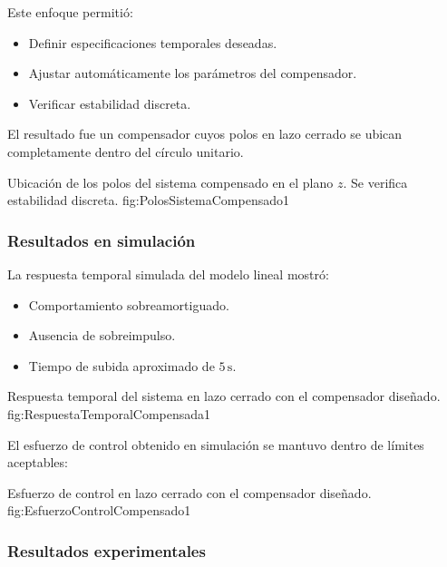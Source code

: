 Este enfoque permitió:

\begin{itemize}
	\item Definir especificaciones temporales deseadas.
	\item Ajustar automáticamente los parámetros del compensador.
	\item Verificar estabilidad discreta.
\end{itemize}

El resultado fue un compensador cuyos polos en lazo cerrado se ubican completamente dentro del círculo unitario.

{Ubicación de los polos del sistema compensado en el plano $z$. Se verifica estabilidad discreta.}
{fig:PolosSistemaCompensado}{1}

\subsubsection{Resultados en simulación}

La respuesta temporal simulada del modelo lineal mostró:

\begin{itemize}
	\item Comportamiento sobreamortiguado.
	\item Ausencia de sobreimpulso.
	\item Tiempo de subida aproximado de $5\,\text{s}$.
\end{itemize}

{Respuesta temporal del sistema en lazo cerrado con el compensador diseñado.}
{fig:RespuestaTemporalCompensada}{1}

El esfuerzo de control obtenido en simulación se mantuvo dentro de límites aceptables:

{Esfuerzo de control en lazo cerrado con el compensador diseñado.}
{fig:EsfuerzoControlCompensado}{1}

\subsubsection{Resultados experimentales}

